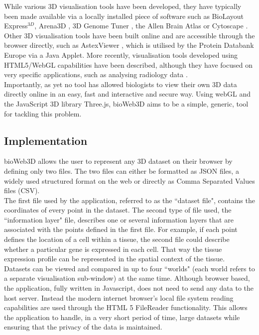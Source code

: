 While various 3D visualisation tools have been developed, they have typically been made available via a locally installed piece of software such as BioLayout Express$^{3D}$\cite{Freeman07}, Arena3D \cite{Pavlopoulos08},  3D Genome Tuner \cite{Wang09}, the Allen Brain Atlas \cite{Lein07} or Cytoscape \cite{Shannon03}. Other 3D visualisation tools have been built online and are accessible through the browser directly, such as AstexViewer \cite{Hartshorn02}, which is utilised by the Protein Databank Europe via a Java Applet. More recently, visualisation tools developed using HTML5/WebGL capabilities have been described, although they have focused on very specific applications, such as analysing radiology data  \cite{Dinesh12}.\\
Importantly, as yet no tool has allowed biologists to view their own 3D data directly online in an easy, fast and interactive and secure way. Using webGL and the JavaScript 3D library Three.js, bioWeb3D aims to be a simple, generic, tool for tackling this problem.\\


	\subsection{Implementation}

bioWeb3D allows the user to represent any 3D dataset on their browser by defining only two files. The two files can either be formatted as JSON files, a widely used structured format on the web \cite{Wilde07} or directly as Comma Separated Values files (CSV).\\

The first file used by the application, referred to as the ``dataset file", contains the coordinates of every point in the dataset. The second type of file used, the ``information layer" file, describes one or several information layers that are associated with the points defined in the first file. For example, if each point defines the location of a cell within a tissue, the second file could describe whether a particular gene is expressed in each cell. That way the tissue expression profile can be represented in the spatial context of the tissue.\\

Datasets can be viewed and compared in up to four ``worlds" (each world refers to a separate visualisation sub-window) at the same time. Although browser based, the application, fully written in Javascript, does not need to send any data to the host server. Instead the modern internet browser's local file system reading capabilities are used through the HTML 5 FileReader functionality. This allows the application to handle, in a very short period of time, large datasets while ensuring that the privacy of the data is maintained.\\

